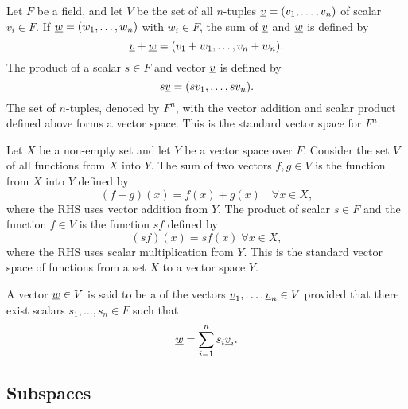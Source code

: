 \begin{example}
Let $F$ be a field, and let $V$ be the set of all $n$-tuples $\underline{v} = (v_1, \ldots, v_n)$ of scalar $v_i \in F$.
If $\underline{w} = (w_1, \ldots, w_n)$ with $w_i \in F$, the sum of $\underline{v}$ and $\underline{w}$ is defined by
\begin{equation*}
\underline{v} + \underline{w} = (v_1 + w_1, \ldots, v_n + w_n).
\end{equation*}
The product of a scalar $s \in F$ and vector $\underline{v}$ is defined by
\begin{equation*}
s \underline{v} = (s v_1, \ldots, s v_n).
\end{equation*}
The set of $n$-tuples, denoted by $F^n$, with the vector addition and scalar product defined above forms a vector space.
This is the standard vector space for $F^n$.
\end{example}

\begin{example}
Let $X$ be a non-empty set and let $Y$ be a vector space over $F$.
Consider the set $V$ of all functions from $X$ into $Y$.
The sum of two vectors $f,g \in V$ is the function from $X$ into $Y$ defined by
\begin{equation*}
(f + g)(x) = f(x) + g(x) \quad \forall x \in X,
\end{equation*}
where the RHS uses vector addition from $Y$.
The product of scalar $s \in F$ and the function $f \in V$ is the function $sf$ defined by
\begin{equation*}
(sf)(x) = s f(x) \; \forall x \in X,
\end{equation*}
where the RHS uses scalar multiplication from $Y$.
This is the standard vector space of functions from a set $X$ to a vector space $Y$.
\end{example}

\begin{definition}
A vector $\underline{w} \in V$ is said to be a  of the vectors $\underline{v}_1, \ldots, \underline{v}_n \in V$ provided that there exist scalars $s_1, \ldots, s_n \in F$ such that
\begin{equation*}
\underline{w} = \sum_{i=1}^n s_i \underline{v}_i.
\end{equation*}
\end{definition}

\subsection{Subspaces}

